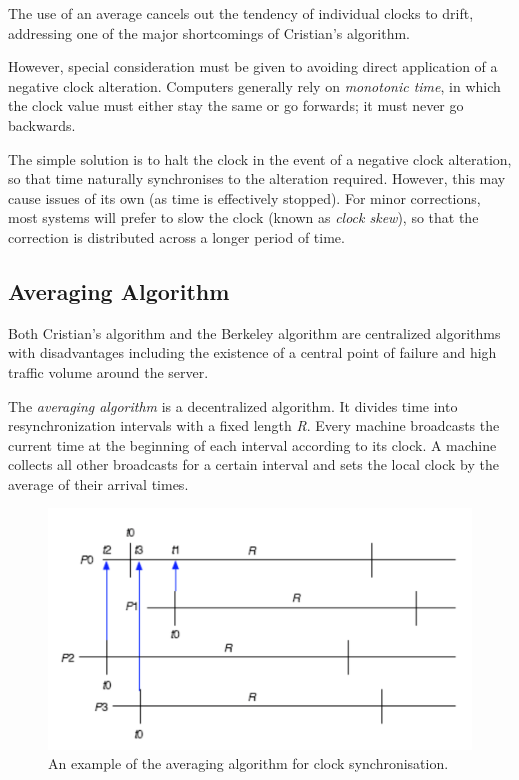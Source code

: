 The use of an average cancels out the tendency of individual clocks to drift, addressing one of the major shortcomings of Cristian's algorithm.

However, special consideration must be given to avoiding direct application of a negative clock alteration. Computers generally rely on \textit{monotonic time}, in which the clock value must either stay the same or go forwards; it must never go backwards.

The simple solution is to halt the clock in the event of a negative clock alteration, so that time naturally synchronises to the alteration required. However, this may cause issues of its own (as time is effectively stopped). For minor corrections, most systems will prefer to slow the clock (known as \textit{clock skew}), so that the correction is distributed across a longer period of time.

\subsection{Averaging Algorithm}
Both Cristian's algorithm and the Berkeley algorithm are centralized algorithms with disadvantages including the existence of a central point of failure and high traffic volume around the server.

The \textit{averaging algorithm} is a decentralized algorithm. It divides time into resynchronization intervals with a fixed length \textit{R}. Every machine broadcasts the current time at the beginning of each interval according to its clock. A machine collects all other broadcasts for a certain interval and sets the local clock by the average of their arrival times. 

\begin{figure}
\centering
\includegraphics[width=0.7\linewidth]{figures/screenshot030}
\caption{An example of the averaging algorithm for clock synchronisation.}
\label{fig:screenshot030}
\end{figure}

